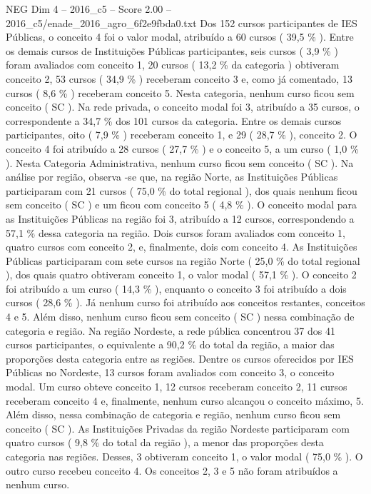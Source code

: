 \begin{textsample}{NEG Dim 4 – 2016\_c5 – Score 2.00 – 2016\_c5/enade\_2016\_agro\_6f2e9fbda0.txt}
Dos 152 cursos participantes de IES Públicas, o conceito 4 foi o valor modal, atribuído a 60 cursos ( 39,5 \% ).
Entre os demais cursos de Instituições Públicas participantes, seis cursos ( 3,9 \% ) foram avaliados com conceito 1, 20 cursos ( 13,2 \% da categoria ) obtiveram conceito 2, 53 cursos ( 34,9 \% ) receberam conceito 3 e, como já comentado, 13 cursos ( 8,6 \% ) receberam conceito 5.
Nesta categoria, nenhum curso ficou sem conceito ( SC ).
Na rede privada, o conceito modal foi 3, atribuído a 35 cursos, o correspondente a 34,7 \% dos 101 cursos da categoria.
Entre os demais cursos participantes, oito ( 7,9 \% ) receberam conceito 1, e 29 ( 28,7 \% ), conceito 2.
O conceito 4 foi atribuído a 28 cursos ( 27,7 \% ) e o conceito 5, a um curso ( 1,0 \% ).
Nesta Categoria Administrativa, nenhum curso ficou sem conceito ( SC ).
Na análise por região, observa -se que, na região Norte, as Instituições Públicas participaram com 21 cursos ( 75,0 \% do total regional ), dos quais nenhum ficou sem conceito ( SC ) e um ficou com conceito 5 ( 4,8 \% ).
O conceito modal para as Instituições Públicas na região foi 3, atribuído a 12 cursos, correspondendo a 57,1 \% dessa categoria na região.
Dois cursos foram avaliados com conceito 1, quatro cursos com conceito 2, e, finalmente, dois com conceito 4.
As Instituições Públicas participaram com sete cursos na região Norte ( 25,0 \% do total regional ), dos quais quatro obtiveram conceito 1, o valor modal ( 57,1 \% ).
O conceito 2 foi atribuído a um curso ( 14,3 \% ), enquanto o conceito 3 foi atribuído a dois cursos ( 28,6 \% ).
Já nenhum curso foi atribuído aos conceitos restantes, conceitos 4 e 5.
Além disso, nenhum curso ficou sem conceito ( SC ) nessa combinação de categoria e região.
Na região Nordeste, a rede pública concentrou 37 dos 41 cursos participantes, o equivalente a 90,2 \% do total da região, a maior das proporções desta categoria entre as regiões.
Dentre os cursos oferecidos por IES Públicas no Nordeste, 13 cursos foram avaliados com conceito 3, o conceito modal.
Um curso obteve conceito 1, 12 cursos receberam conceito 2, 11 cursos receberam conceito 4 e, finalmente, nenhum curso alcançou o conceito máximo, 5.
Além disso, nessa combinação de categoria e região, nenhum curso ficou sem conceito ( SC ).
As Instituições Privadas da região Nordeste participaram com quatro cursos ( 9,8 \% do total da região ), a menor das proporções desta categoria nas regiões.
Desses, 3 obtiveram conceito 1, o valor modal ( 75,0 \% ).
O outro curso recebeu conceito 4.
Os conceitos 2, 3 e 5 não foram atribuídos a nenhum curso.

\end{textsample}
